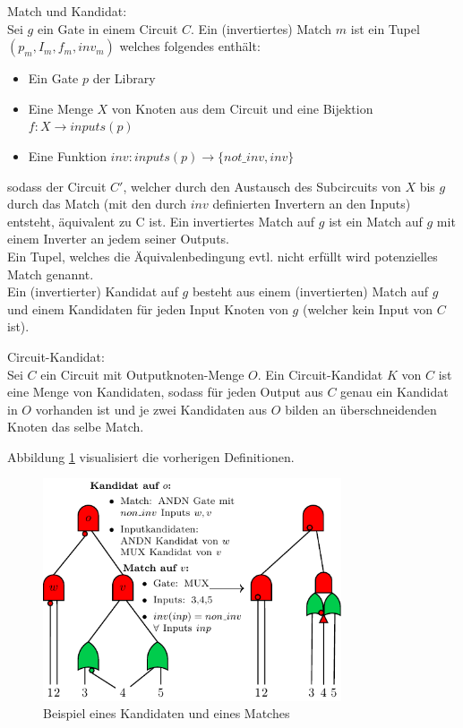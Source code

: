 \documentclass[11pt, a4paper, german]{article}
\begin{document}
\begin{definition}{Match und Kandidat:}\\
Sei $g$ ein Gate in einem Circuit $C$. Ein (invertiertes) Match $m$ ist ein Tupel $(p_m, I_m, f_m, inv_m)$ welches folgendes enthält:
\begin{itemize}
\item Ein Gate $p$ der Library
\item Eine Menge $X$ von Knoten aus dem Circuit und eine Bijektion $ f: X \rightarrow inputs(p)$
\item Eine Funktion $ inv : inputs(p) \rightarrow \{not\_inv , inv \}$
\end{itemize}
sodass der Circuit $C'$, welcher durch den Austausch des Subcircuits von $X$ bis $g$ durch das Match (mit den durch $inv$ definierten Invertern an den Inputs) entsteht, äquivalent zu C ist.
Ein invertiertes Match auf $g$ ist ein Match auf $g$ mit einem Inverter an jedem seiner Outputs.\\
Ein Tupel, welches die Äquivalenbedingung evtl. nicht erfüllt wird potenzielles Match genannt.\\
Ein (invertierter) Kandidat auf $g$ besteht aus einem (invertierten) Match auf $g$ und einem Kandidaten für jeden Input Knoten von $g$ (welcher kein Input von $C$ ist).
\end{definition}
\begin{definition}{Circuit-Kandidat:}\\
Sei $C$ ein Circuit mit Outputknoten-Menge $O$. Ein Circuit-Kandidat $K$ von $C$ ist eine Menge von Kandidaten, sodass für jeden Output aus $C$ genau ein Kandidat in $O$ vorhanden ist und je zwei Kandidaten aus $O$ bilden an überschneidenden Knoten das selbe Match.
\end{definition}
Abbildung \ref{bild:grundl_definitionen} visualisiert die vorherigen Definitionen.\\
\begin{figure}[h]
\begin{center}
 \includegraphics[width = 250pt]{./pictures/compiled/grundl_def_veransch.pdf}
 \caption{Beispiel eines  Kandidaten und eines Matches}
 \label{bild:grundl_definitionen}
\end{center}
\end{figure}
\end{document}
